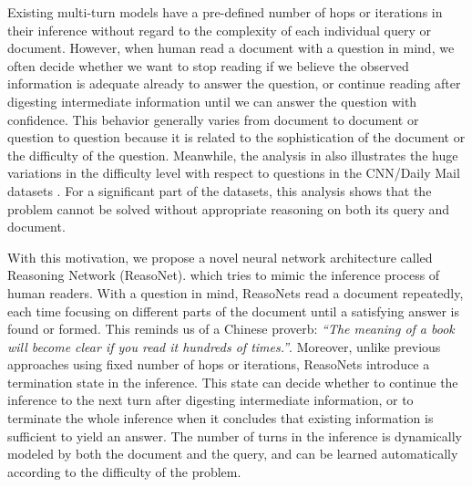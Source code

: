 \documentclass[sigconf]{acmart}
\begin{document}
Existing multi-turn models have a pre-defined number of hops or iterations in their inference without regard to the complexity of each individual query or document. However, when human read a document with a question in mind, we often decide whether we want to stop reading if we believe the observed information is adequate already to answer the question, or continue reading after digesting intermediate information until we can answer the question with confidence. This behavior generally varies from document to document or question to question because it is related to the sophistication of the document or the difficulty of the question. Meanwhile, the analysis in \cite{ChenACL2016} also illustrates the huge variations in the difficulty level with respect to questions in the CNN/Daily Mail datasets \citep{HermannNIPS2015}. For a significant part of the datasets, this analysis shows that the problem cannot be solved without appropriate reasoning on both its query and document.



With this motivation, we propose a novel neural network architecture called Reasoning Network ({ReasoNet}). which tries to mimic the inference process of human readers. With a question in mind, ReasoNets read a document repeatedly, each time focusing on different parts of the document until a satisfying answer is found or formed. This reminds us of a Chinese proverb: \emph{``The meaning of a book will become clear if you read it hundreds of times.''}.
Moreover, unlike previous approaches using fixed number of hops or iterations, ReasoNets introduce a termination state in the inference. This state can decide whether to continue the inference to the next turn after digesting intermediate information, or to terminate the whole inference when it concludes that existing information is sufficient to yield an answer. The number of turns in the inference is dynamically modeled by both the document and the query, and can be learned automatically according to the difficulty of the problem. 
\end{document}
